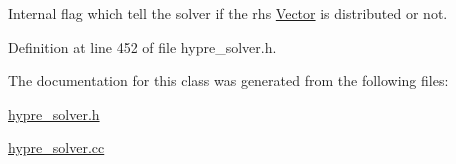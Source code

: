 Internal flag which tell the solver if the rhs \hyperlink{classoomph_1_1Vector}{Vector} is distributed or not. 



Definition at line 452 of file hypre\+\_\+solver.\+h.



The documentation for this class was generated from the following files\+:\begin{DoxyCompactItemize}
\item 
\hyperlink{hypre__solver_8h}{hypre\+\_\+solver.\+h}\item 
\hyperlink{hypre__solver_8cc}{hypre\+\_\+solver.\+cc}\end{DoxyCompactItemize}
